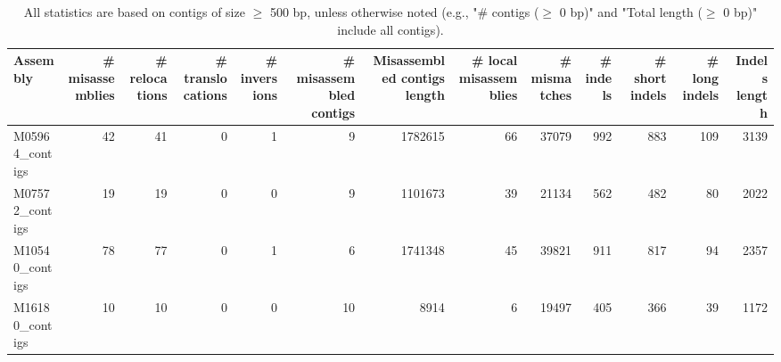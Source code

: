 \documentclass[12pt,a4paper]{article}
\begin{document}
\begin{table}[ht]
\begin{center}
\caption{All statistics are based on contigs of size $\geq$ 500 bp, unless otherwise noted (e.g., "\# contigs ($\geq$ 0 bp)" and "Total length ($\geq$ 0 bp)" include all contigs).}
\begin{tabular}{|l*{12}{|r}|}
\hline
Assembly & \# misassemblies &     \# relocations &     \# translocations &     \# inversions & \# misassembled contigs & Misassembled contigs length & \# local misassemblies & \# mismatches & \# indels &     \# short indels &     \# long indels & Indels length \\ \hline
M05964\_contigs & 42 & 41 & 0 & 1 & 9 & 1782615 & 66 & 37079 & 992 & 883 & 109 & 3139 \\ \hline
M07572\_contigs & 19 & 19 & 0 & 0 & 9 & 1101673 & 39 & 21134 & 562 & 482 & 80 & 2022 \\ \hline
M10540\_contigs & 78 & 77 & 0 & 1 & 6 & 1741348 & 45 & 39821 & 911 & 817 & 94 & 2357 \\ \hline
M16180\_contigs & 10 & 10 & 0 & 0 & 10 & 8914 & 6 & 19497 & 405 & 366 & 39 & 1172 \\ \hline
\end{tabular}
\end{center}
\end{table}
\end{document}

